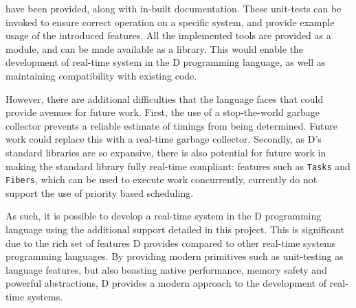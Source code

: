 have been provided, along with in-built documentation. 
These unit-tests can be invoked to ensure correct operation on a specific
system, and provide example usage of the introduced features. 
All the implemented tools are provided as a module, and can be made available as 
a library. This would enable the development of real-time system in the D programming 
language, as well as maintaining compatibility with existing code. 
\par\bigskip\noindent
However, there are additional difficulties that the 
language faces that could provide avenues for future work. 
First, the use of a stop-the-world garbage collector prevents a reliable 
estimate of timings from being determined. Future work could replace this with a
real-time garbage collector. 
Secondly, as D's standard libraries are so expansive, there is also potential for future
work in making the standard library fully real-time compliant: features such as
\texttt{Tasks} and \texttt{Fibers}, which can be used to execute work
concurrently, currently do not support the use of priority based scheduling. 
\par\bigskip\noindent
As such, it is possible to develop a real-time system in the D programming 
language using the additional support detailed in this project. This is
significant due to the rich set of features D provides compared to other
real-time systems programming languages. By providing modern primitives such as
unit-testing as language features, but also boasting native performance, 
memory safety and powerful abstractions, D provides a modern approach to the
development of real-time systems. 

